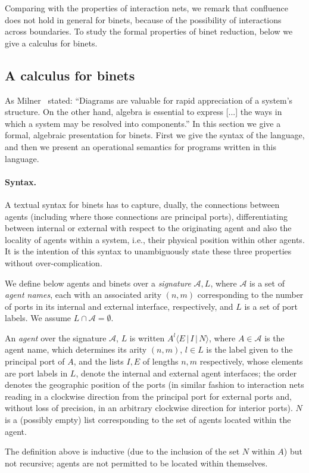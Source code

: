 \documentclass[copyright,creativecommons]{eptcs}
\begin{document}
Comparing with the properties of interaction nets, we remark that
confluence does not hold in general for binets, because of the
possibility of interactions across boundaries. 
To study the formal properties of binet reduction, below we give a 
calculus for binets.


\subsection{A calculus for binets}
\label{sec:formal}

As Milner~\cite{Milner} stated: ``Diagrams are valuable for rapid
appreciation of a system's structure. On the other hand, algebra is
essential to express [...] the ways in which a system may be resolved
into components.'' In this section we give a formal, algebraic
presentation for binets.  First we give the syntax of the language,
and then we present an operational semantics for programs written in
this language.

\paragraph{Syntax.}
\newcommand\bnet[5]{\ensuremath{#1^{#2} \langle #3 \,|\, #4 \,|\, #5 \rangle}}
\newcommand\bnets[2]{\ensuremath{#1^{#2} \langle \rangle}}
\newcommand\bnetm[3]{\ensuremath{#1^{#2} \langle #3 \rangle}}

A textual syntax for binets has to capture, dually, the connections
between agents (including where those connections are principal
ports), differentiating between internal or external with respect to
the originating agent and also the locality of agents within a system,
i.e., their physical position within other agents. It is the intention
of this syntax to unambiguously state these three properties without
over-complication. 

We define below agents and binets over a \emph{signature}
$\mathcal{A},L$, where $\mathcal{A}$ is a set of \emph{agent names},
each with an associated arity $(n,m)$ corresponding to the number of
ports in its internal and external interface, respectively, and $L$ is
a set of port labels. We assume $L \cap \mathcal{A} = \emptyset$.


\begin{definition}[Agent]
An \emph{agent} over the signature $\mathcal{A}$, $L$ is written
$\bnet{A}{l}{E}{I}{N}$, where $A\in\mathcal{A}$ is the agent name,
which determines its arity $(n,m)$, $l \in L$ is the label given to
the principal port of $A$, and the lists $I, E$ of lengths $n,m$
respectively, whose elements are port labels in $L$, denote the
internal and external agent interfaces; the order denotes the
geographic position of the ports (in similar fashion to interaction
nets reading in a clockwise direction from the principal port for
external ports and, without loss of precision, in an arbitrary
clockwise direction for interior ports). $N$ is a (possibly empty)
list corresponding to the set of agents located within the agent.
\end{definition}
The definition above is inductive (due to the inclusion of the set $N$
within $A$) but not recursive; agents are not permitted to be located within themselves.
\end{document}

